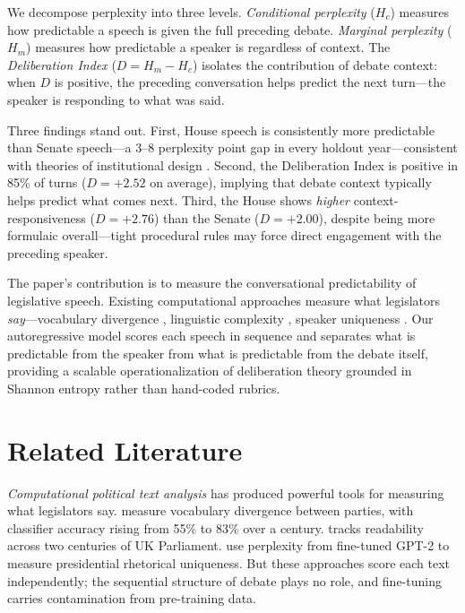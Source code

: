 \documentclass[12pt]{article}
\newcommand{\Hc}{H_c}
\newcommand{\Hm}{H_m}
\newcommand{\DI}{\mathit{D}}
\begin{document}
We decompose perplexity into three levels. \textit{Conditional perplexity} ($\Hc$) measures how predictable a speech is given the full preceding debate. \textit{Marginal perplexity} ($\Hm$) measures how predictable a speaker is regardless of context. The \textit{Deliberation Index} ($\DI = \Hm - \Hc$) isolates the contribution of debate context: when $\DI$ is positive, the preceding conversation helps predict the next turn---the speaker is responding to what was said.

Three findings stand out. First, House speech is consistently more predictable than Senate speech---a 3--8 perplexity point gap in every holdout year---consistent with theories of institutional design \citep{perssonTabellini2000}. Second, the Deliberation Index is positive in 85\% of turns ($\DI = +2.52$ on average), implying that debate context typically helps predict what comes next. Third, the House shows \textit{higher} context-responsiveness ($\DI = +2.76$) than the Senate ($\DI = +2.00$), despite being more formulaic overall---tight procedural rules may force direct engagement with the preceding speaker.

The paper's contribution is to measure the conversational predictability of legislative speech. Existing computational approaches measure what legislators \textit{say}---vocabulary divergence \citep{gentzkow2019}, linguistic complexity \citep{spirling2016}, speaker uniqueness \citep{zhou2024}. Our autoregressive model scores each speech in sequence and separates what is predictable from the speaker from what is predictable from the debate itself, providing a scalable operationalization of deliberation theory \citep{habermas1996, steiner2004} grounded in Shannon entropy rather than hand-coded rubrics.


\section{Related Literature}

\textit{Computational political text analysis} has produced powerful tools for measuring what legislators say. \citet{gentzkow2019} measure vocabulary divergence between parties, with classifier accuracy rising from 55\% to 83\% over a century. \citet{spirling2016} tracks readability across two centuries of UK Parliament. \citet{zhou2024} use perplexity from fine-tuned GPT-2 to measure presidential rhetorical uniqueness. But these approaches score each text independently; the sequential structure of debate plays no role, and fine-tuning carries contamination from pre-training data.
\end{document}
